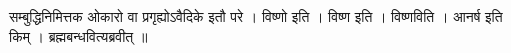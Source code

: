 सम्बुद्धिनिमित्तक ओकारो वा प्रगृह्योऽवैदिके इतौ परे । विष्णो इति । विष्ण
इति । विष्णविति । आनर्ष इति किम् । ब्रह्मबन्धवित्यब्रवीत् ॥
